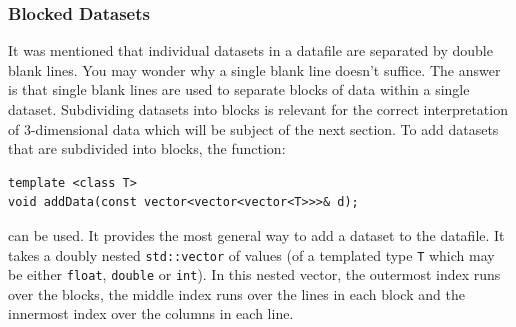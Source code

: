 \documentclass[11pt]{article}
\begin{document}
\subsubsection{Blocked Datasets}
It was mentioned that individual datasets in a datafile are separated by double blank lines. You may wonder why a single blank line doesn't suffice. The answer is that single blank lines are used to separate blocks of data within a single dataset. Subdividing datasets into blocks is relevant for the correct interpretation of 3-dimensional data which will be subject of the next section. To add datasets that are subdivided into blocks, the function:
\begin{verbatim}
template <class T>
void addData(const vector<vector<vector<T>>>& d);
\end{verbatim}
can be used. It provides the most general way to add a dataset to the datafile. It takes a doubly nested \texttt{std::vector} of values (of a templated type \texttt{T} which may be either \texttt{float}, \texttt{double} or \texttt{int}). In this nested vector, the outermost index runs over the blocks, the middle index runs over the lines in each block and the innermost index over the columns in each line.
\end{document}
